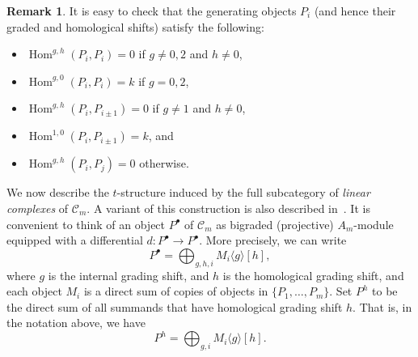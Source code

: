 \documentclass{amsart}
\theoremstyle{definition}
\newtheorem{remark}[theorem]{Remark}
\DeclareMathOperator{\Hom}{Hom} %
\newcommand{\darkblue}{\color{darkblue}} %
\newcommand{\defn}[1]{\textsl{\darkblue #1}} %
\begin{document}
\begin{remark}\label{rem:generating-morphisms}
  It is easy to check that the generating objects \(P_i\) (and hence their graded and homological shifts) satisfy the following:
  \begin{itemize}
  \item \(\Hom^{g,h}(P_i,P_i) = 0\) if \(g \neq 0, 2\) and \(h \neq 0\),
  \item \(\Hom^{g,0}(P_i,P_i) = k\) if \(g = 0, 2\),
  \item \(\Hom^{g,h}(P_i, P_{i\pm1}) = 0\) if \(g \neq 1\) and \(h \neq 0\),
  \item \(\Hom^{1,0}(P_i, P_{i\pm1}) = k\), and
  \item \(\Hom^{g,h}(P_i, P_j) = 0 \) otherwise.
  \end{itemize}
\end{remark}

We now describe the \(t\)-structure induced by the full subcategory of \defn{linear complexes} of \(\mathcal{C}_m\).
A variant of this construction is also described in~\cite[Sect.~2.5]{lic.que:21}.
It is convenient to think of an object \(P^{\bullet}\) of \(\mathcal{C}_m\)
as bigraded (projective) \(A_m\)-module equipped with a differential \(d \colon P^{\bullet} \to P^{\bullet}\).
More precisely, we can write
\[P^{\bullet} = \bigoplus_{g,h,i} M_i\langle g \rangle[h],\]
where \(g\) is the internal grading shift, and \(h\) is the homological grading shift, and 
each object \(M_i\) is a direct sum of copies of objects in \(\{P_1,\ldots, P_m\}\).
Set \(P^h\) to be the direct sum of all summands that have homological grading shift \(h\).
That is, in the notation above, we have
\[P^{h} = \bigoplus_{g,i} M_i\langle g \rangle[h].\]
\end{document}
